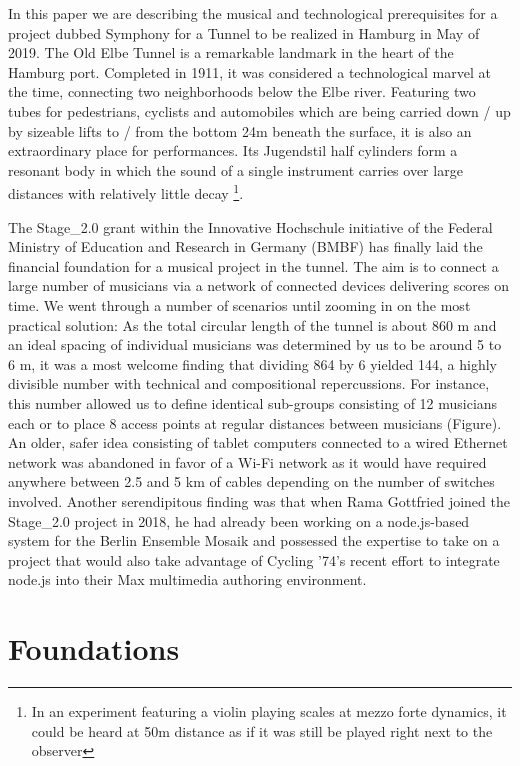 In this paper we are describing the musical and technological prerequisites for a project dubbed Symphony for a Tunnel to be realized in Hamburg in May of 2019. The Old Elbe Tunnel is a remarkable landmark in the heart of the Hamburg port. Completed in 1911, it was considered a technological marvel at the time, connecting two neighborhoods below the Elbe river. Featuring two tubes for pedestrians, cyclists and automobiles which are being carried down / up by sizeable lifts to / from the bottom 24m beneath the surface, it is also an extraordinary place for performances. Its Jugendstil half cylinders form a resonant body in which the sound of a single instrument carries over large distances with relatively little decay \footnote{In an experiment featuring a violin playing scales at mezzo forte dynamics, it could be heard at 50m distance as if it was still be played right next to the observer}.

The Stage\_2.0 grant within the Innovative Hochschule initiative of the Federal Ministry of Education and Research in Germany (BMBF) has finally laid the financial foundation for a musical project in the tunnel. The aim is to connect a large number of musicians via a network of connected devices delivering scores on time. We went through a number of scenarios until zooming in on the most practical solution: As the total circular length of the tunnel is about 860 m and an ideal spacing of individual musicians was determined by us to be around 5 to 6 m, it was a most welcome finding that dividing 864 by 6 yielded 144, a highly divisible number with technical and compositional repercussions. For instance, this number allowed us to define identical sub-groups consisting of 12 musicians each or to place 8 access points at regular distances between musicians (Figure). An older, safer idea consisting of tablet computers connected to a wired Ethernet network was abandoned in favor of a Wi-Fi network as it would have required anywhere between 2.5 and 5 km of cables depending on the number of switches involved. 
Another serendipitous finding was that when Rama Gottfried joined the Stage\_2.0 project in 2018, he had already been working on a node.js-based system for the Berlin Ensemble Mosaik and possessed the expertise to take on a project that would also take advantage of Cycling ’74’s recent effort to integrate node.js into their Max multimedia authoring environment.




\section{Foundations} \label{sec:foundations} 
%
%  
%
%


